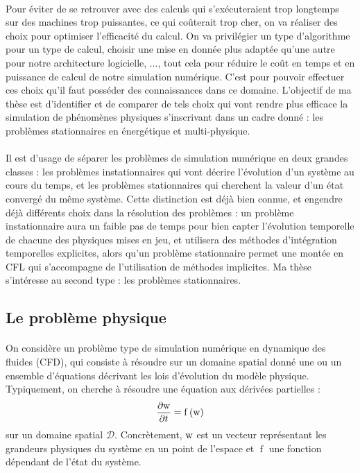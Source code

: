 	\paragraph{}
	Pour éviter de se retrouver avec des calculs qui s'exécuteraient trop longtemps sur des machines trop puissantes, ce qui coûterait trop cher, on va réaliser des choix pour optimiser l'efficacité du calcul.
	On va privilégier un type d'algorithme pour un type de calcul, choisir une mise en donnée plus adaptée qu'une autre pour notre architecture logicielle, ..., tout cela pour réduire le coût en temps et en puissance de calcul de notre simulation numérique.
	C'est pour pouvoir effectuer ces choix qu'il faut posséder des connaissances dans ce domaine.
	L'objectif de ma thèse est d'identifier et de comparer de tels choix qui vont rendre plus efficace la simulation de phénomènes physiques s'inscrivant dans un cadre donné : les problèmes stationnaires en énergétique et multi-physique.

	\paragraph{}
	Il est d'usage de séparer les problèmes de simulation numérique en deux grandes classes : les problèmes instationnaires qui vont décrire l'évolution d'un système au cours du temps, et les problèmes stationnaires qui cherchent la valeur d'un état convergé du même système.
	Cette distinction est déjà bien connue, et engendre déjà différents choix dans la résolution des problèmes : un problème instationnaire aura un faible pas de temps pour bien capter l'évolution temporelle de chacune des physiques mises en jeu, et utilisera des méthodes d'intégration temporelles explicites, alors qu'un problème stationnaire permet une montée en CFL qui s'accompagne de l'utilisation de méthodes implicites.
	Ma thèse s'intéresse au second type : les problèmes stationnaires.


	\subsection{Le problème physique}

		\paragraph{}
		On considère un problème type de simulation numérique en dynamique des fluides (CFD), qui consiste à résoudre sur un domaine spatial donné une ou un ensemble d'équations décrivant les lois d'évolution du modèle physique.
		Typiquement, on cherche à résoudre une équation aux dérivées partielles :
		\begin{equation}\label{eq:edp_0}
			\frac{\partial\textup{w}}{\partial t} = \operatorname{f}\left(\textup{w}\right)
		\end{equation}
		sur un domaine spatial $\mathcal{D}$.
		Concrètement, $\textup{w}$ est un vecteur représentant les grandeurs physiques du système en un point de l'espace et $\operatorname{f}$ une fonction dépendant de l'état du système.

